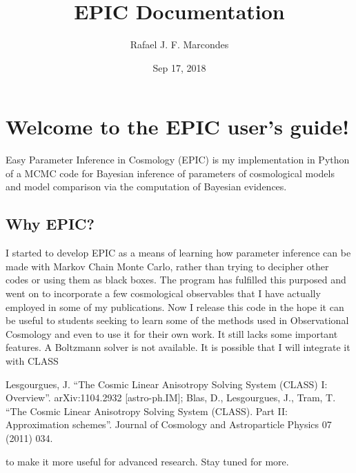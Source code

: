 \documentclass[letterpaper,12pt,english]{sphinxhowto}
\title{EPIC Documentation}
\date{Sep 17, 2018}
\author{Rafael J. F. Marcondes}
\begin{document}
\maketitle
\sphinxtableofcontents
{}\label{\detokenize{index::doc}}



\section{Welcome to the EPIC user’s guide!}
\label{\detokenize{welcome:welcome-to-the-epic-user-s-guide}}\label{\detokenize{welcome::doc}}
Easy Parameter Inference in Cosmology
(EPIC) is my implementation in Python of a MCMC code for
Bayesian inference of parameters of cosmological models and model comparison via
the computation of Bayesian evidences.


\subsection{Why EPIC?}
\label{\detokenize{welcome:why-epic}}
I started to develop EPIC as a means of learning how parameter inference can be
made with Markov Chain Monte Carlo, rather than trying to decipher other
codes or using them as black boxes.
The program has fulfilled this purposed and went on to incorporate a few
cosmological observables that I have actually employed in some of my
publications. Now I release this code in the hope it can be useful to
students seeking to learn some of the methods used in Observational Cosmology
and even to use it for their own work.
It still lacks some important features.
A Boltzmann solver is not available.
It is possible that I will integrate it with CLASS %
\begin{footnote}[1]\sphinxAtStartFootnote
Lesgourgues, J. “The Cosmic Linear Anisotropy Solving System (CLASS) I: Overview”. arXiv:1104.2932 {[}astro-ph.IM{]}; Blas, D., Lesgourgues, J., Tram, T. “The Cosmic Linear Anisotropy Solving System (CLASS). Part II: Approximation schemes”. Journal of Cosmology and Astroparticle Physics 07 (2011) 034.
%
\end{footnote} to make it more
useful for advanced research.
Stay tuned for more.
\end{document}
